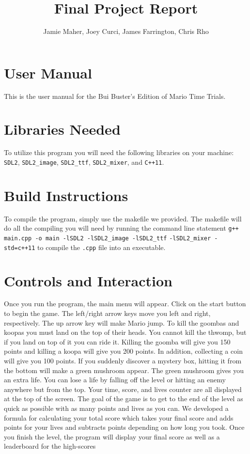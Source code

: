 \documentclass[letterpaper]{article}
\title{Final Project Report}
\date{}
\author{Jamie Maher, Joey Curci, James Farrington, Chris Rho}
\begin{document}
\maketitle
\section*{User Manual}

This is the user manual for the Bui Buster's Edition of Mario Time Trials.

\section*{Libraries Needed}

To utilize this program you will need the following libraries on your machine: \verb|SDL2|, \verb|SDL2_image|, \verb|SDL2_ttf|, \verb|SDL2_mixer|, and \verb|C++11|.

\section*{Build Instructions}

To compile the program, simply use the makefile we provided.  The makefile will do all the compiling you will need by running the command line statement \verb|g++ main.cpp -o main -lSDL2 -lSDL2_image -lSDL2_ttf| 
\verb|-lSDL2_mixer -std=c++11| to compile the \verb|.cpp| file into an executable.

\section*{Controls and Interaction}

Once you run the program, the main menu will appear.  Click on the start button to begin the game.  The left/right arrow keys move you left and right, respectively.  The up arrow key will make Mario jump. To kill the goombas and koopas you must land on the top of their heads. You cannot kill the thwomp, but if you land on top of it you can ride it.  Killing the goomba will give you 150 points and killing a koopa will give you 200 points.  In addition, collecting a coin will give you 100 points.  If you suddenly discover a mystery box, hitting it from the bottom will make a green mushroom appear.  The green mushroom gives you an extra life.  You can lose a life by falling off the level or hitting an enemy anywhere but from the top.  Your time, score, and lives counter are all displayed at the top of the screen.  The goal of the game is to get to the end of the level as quick as possible with as many points and lives as you can. We developed a formula for calculating your total score which takes your final score and adds points for your lives and subtracts points depending on how long you took.  Once you finish the level, the program will display your final score as well as a leaderboard for the high-scores
\end{document}
